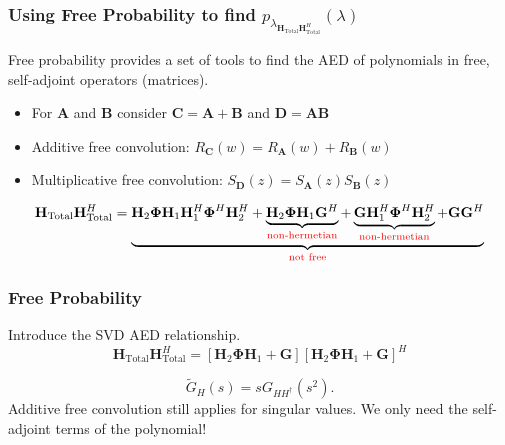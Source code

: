 \documentclass[10pt,tgadventor, onlymath]{beamer}
\begin{document}
\begin{frame}
\frametitle{Using Free Probability to find $p_{\lambda_{\mathbf{H}_{\text{Total}}\mathbf{H}_{\text{Total}}^H}}(\lambda)$}
Free probability provides a set of tools to find the AED of polynomials in free, self-adjoint operators (matrices).

\begin{itemize}
\item 
	For $\mathbf{A}$ and $\textbf{B}$ consider $\mathbf{C} = \mathbf{A} + \textbf{B}$ and $\mathbf{D} = \mathbf{A}\textbf{B}$
\item 
	Additive free convolution: $R_{\mathbf{C}}(w) = R_{\mathbf{A}}(w) + R_{\mathbf{B}}(w)$
\item 
	Multiplicative free convolution: $S_{\mathbf{D}}(z) = S_{\mathbf{A}}(z)S_{\mathbf{B}}(z)$
\end{itemize}

\begin{equation*}
\mathbf{H}_{\text{Total}}\mathbf{H}_{\text{Total}}^H 
= 
\underbrace{
\mathbf{H}_{2}\boldsymbol{\Phi}\mathbf{H}_{1}\mathbf{H}_{1}^H\boldsymbol{\Phi}^H\mathbf{H}_{2}^H +
\underbrace{\mathbf{H}_{2}\boldsymbol{\Phi}\mathbf{H}_{1}\mathbf{G}^H}_{\color{red}{\text{non-hermetian}}}+
\underbrace{\mathbf{G}\mathbf{H}_{1}^H\boldsymbol{\Phi}^H\mathbf{H}_{2}^H}_{\color{red}{\text{non-hermetian}}}+
\mathbf{G}\mathbf{G}^H
}_
{\color{red}{\text{not free}}}
\end{equation*}
\end{frame}

\begin{frame}
\frametitle{Free Probability}
Introduce the SVD AED relationship.
\begin{equation}
\mathbf{H}_{\text{Total}}\mathbf{H}_{\text{Total}}^H 
=
[\mathbf{H}_{2}\boldsymbol{\Phi}\mathbf{H}_{1} + \mathbf{G}][\mathbf{H}_{2}\boldsymbol{\Phi}\mathbf{H}_{1} + \mathbf{G}]^H
\end{equation}

\begin{equation}\label{svd_aed_property}
\tilde{G}_{H}(s) = sG_{HH^{\dagger}}(s^2).
\end{equation}
Additive free convolution still applies for singular values.
We only need the self-adjoint terms of the polynomial!
\end{frame}
\end{document}
